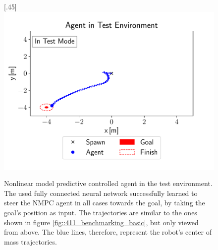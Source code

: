 \begin{figure}[h!]
	\subcaptionbox{}%
	[.45\linewidth]{\includegraphics[scale=.45]{chapters/04_experiments/02_autonomous_walking/test_mode_m4_m4.pdf}}
	\caption{Nonlinear model predictive controlled agent in the test environment. The used fully connected neural network successfully learned to steer the NMPC agent in all cases towards the goal, by taking the goal's position as input. The trajectories are similar to the ones shown in figure \ref{fig::411_benchmarking_basic}, but only viewed from above. The blue lines, therefore, represent the robot's center of mass trajectories.}	
	\label{fig::432_nmpc_ppo_env}
\end{figure} 
